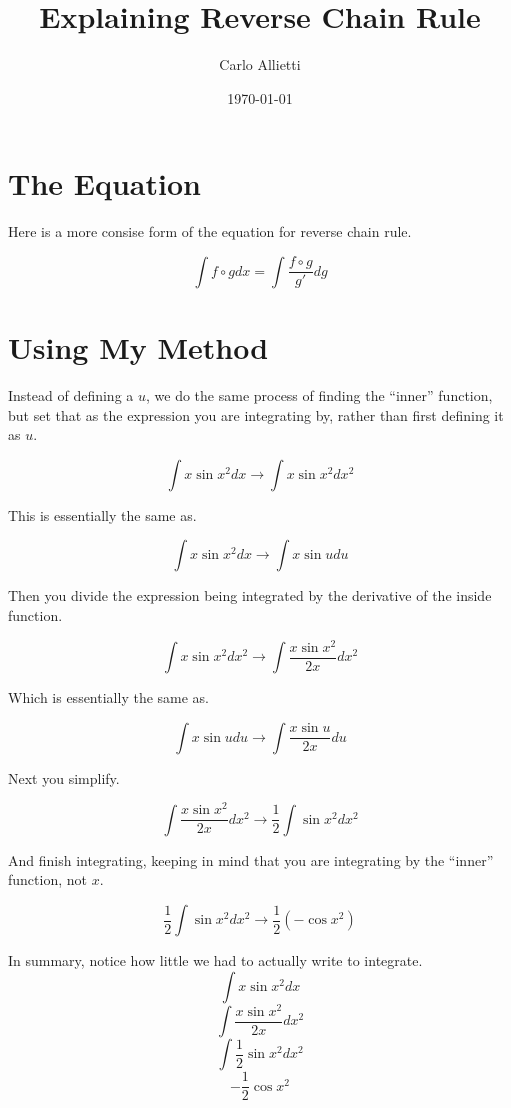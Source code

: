\documentclass[a4paper, 12p]{article}
\begin{document}
\author{Carlo Allietti}
\title{Explaining Reverse Chain Rule}
\date{\today}


\maketitle

\section{The Equation}

Here is a more consise form of the equation for reverse chain rule.

\[\int f \circ g dx = \int \frac{f \circ g}{g'} dg\]

\section{Using My Method}

Instead of defining a $u$, we do the same process of finding the ``inner'' function, but set that as the expression you are integrating by, rather than first defining it as $u$.

\[\int x \sin x^{2} dx \rightarrow \int x \sin x^{2} d x^{2}\]

This is essentially the same as.

\[\int x \sin x^{2} dx \rightarrow \int x \sin u du\]

Then you divide the expression being integrated by the derivative of the inside function.

\[\int x \sin x^{2} dx^{2} \rightarrow \int \frac{x \sin x^{2}}{2x} dx^{2} \]

Which is essentially the same as.

\[\int x \sin u du \rightarrow \int \frac{x \sin u}{2x} du \]

Next you simplify.

\[\int \frac{x \sin x^{2}}{2x} dx^{2} \rightarrow \frac{1}{2}\int \sin x^{2} dx^{2} \]

And finish integrating, keeping in mind that you are integrating by the ``inner'' function, not $x$.

\[\frac{1}{2}\int \sin x^{2} dx^{2} \rightarrow \frac{1}{2}(- \cos x^{2}) \]

In summary, notice how little we had to actually write to integrate.
\[\int x \sin x^{2} dx\]
\[\int \frac{x \sin x^{2}}{2x} dx^{2}\]
\[\int \frac{1}{2} \sin x^{2} dx^{2}\]
\[-\frac{1}{2} \cos x^{2}\]
\end{document}
